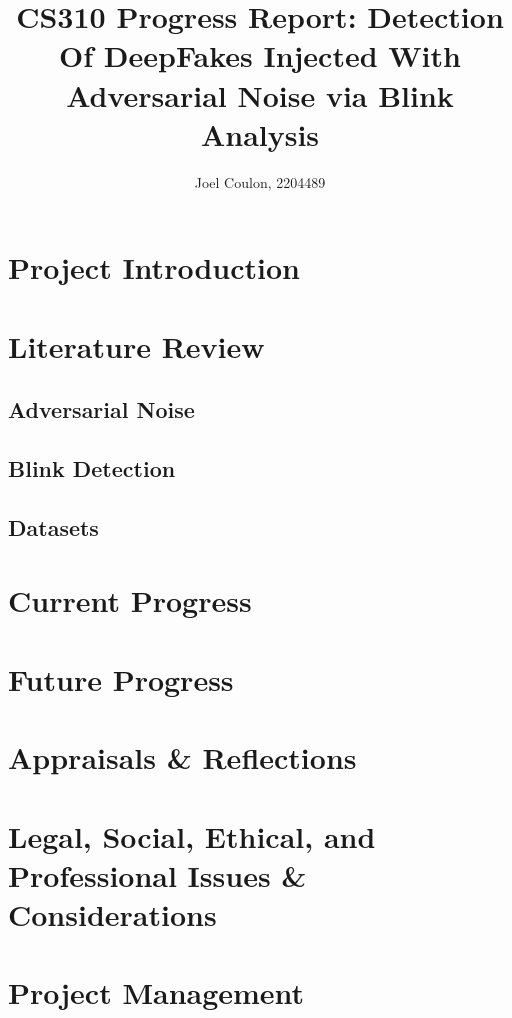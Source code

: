 \documentclass{article}
\title{CS310 Progress Report: Detection Of DeepFakes Injected With Adversarial Noise via Blink Analysis}
\author{Joel Coulon, 2204489}
\date{}
\begin{document}
\maketitle

\section{Project Introduction}

\section{Literature Review}
\subsection{Adversarial Noise}
\subsection{Blink Detection}
\subsection{Datasets}

\section{Current Progress}

\section{Future Progress}

\section{Appraisals \& Reflections}

\section{Legal, Social, Ethical, and Professional Issues \& Considerations}

\section{Project Management}



\end{document}
